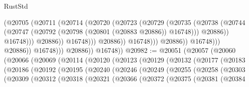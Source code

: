 \begin{lexlean}{RustStd}
\begin{coremodule}
                                            (@20705
                                              (@20711
                                                (@20714
                                                  (@20720
                                                    (@20723
                                                      (@20729
                                                        (@20735
                                                          (@20738
                                                            (@20744
                                                              (@20747
                                                                (@20792
                                                                  (@20798
                                                                    (@20801 (@20883 @20886))
                                                                    @16748)))
                                                              @20886))
                                                          @16748)))
                                                    @20886))
                                                @16748)))
                                          @20886))
                                      @16748)))
                                @20886))
                            @16748)))
                      @20886))
                  @16748)))
            @20886))
        @16748))
@20982 := @20051
    (@20057
      (@20060
        (@20066
          (@20069
            (@20114
              (@20120
                (@20123
                  (@20129
                    (@20132
                      (@20177
                        (@20183
                          (@20186
                            (@20192
                              (@20195
                                (@20240
                                  (@20246
                                    (@20249
                                      (@20255
                                        (@20258
                                          (@20303
                                            (@20309
                                              (@20312
                                                (@20318
                                                  (@20321
                                                    (@20366
                                                      (@20372
                                                        (@20375
                                                          (@20381
                                                            (@20384

\end{coremodule}
\end{lexlean}
